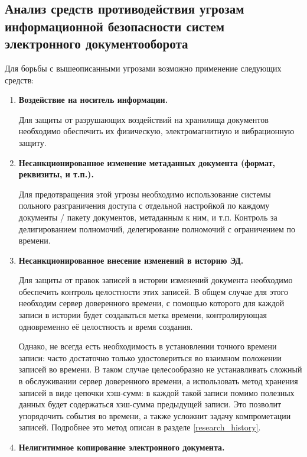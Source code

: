 \subsection{Анализ средств противодействия угрозам информационной безопасности систем электронного документооборота} \label{threats_neutralizers}

Для борьбы с вышеописанными угрозами возможно применение следующих средств:
\begin{enumerate}
	\item \textbf{Воздействие на носитель информации.}

	Для защиты от разрушающих воздействий на хранилища документов необходимо обеспечить их физическую, электромагнитную и вибрационную защиту.

	\item \textbf{Несанкционированное изменение метаданных документа (формат, реквизиты, и т.п.).}

	Для предотвращения этой угрозы необходимо использование системы польного разграничения доступа с отдельной настройкой по каждому документы / пакету документов, метаданным к ним, и т.п. Контроль за делигированием полномочий, делегирование полномочий с ограничением по времени.

	\item \textbf{Несанкционированное внесение изменений в историю ЭД.}

	Для защиты от правок записей в истории изменений документа необходимо обеспечить контроль целостности этих записей. В общем случае для этого необходим сервер доверенного времени, с помощью которого для каждой записи в истории будет создаваться метка времени, контролирующая одновременно её целостность и время создания.

	Однако, не всегда есть необходимость в установлении точного времени записи: часто достаточно только удостовериться во взаимном положении записей во времени. В таком случае целесообразно не устанавливать сложный в обслуживании сервер доверенного времени, а использовать метод хранения записей в виде цепочки хэш-сумм: в каждой такой записи помимо полезных данных будет содержаться хэш-сумма предыдущей записи. Это позволит упорядочить события во времени, а также усложнит задачу компрометации записей. Подробнее это метод описан в разделе \ref{research_history}.

	\item \textbf{Нелигитимное копирование электронного документа.}


\end{enumerate}
